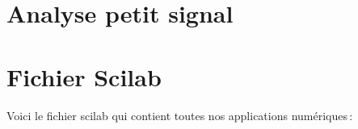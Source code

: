 \documentclass[10pt]{article}
\begin{document}
 \section{Analyse petit signal}
 
 \appendix
 \section{Fichier Scilab}
 Voici le fichier scilab qui contient toutes nos applications numériques\,:
 
 \inputminted[linenos]{matlab}{scilab.sci}
\end{document}

